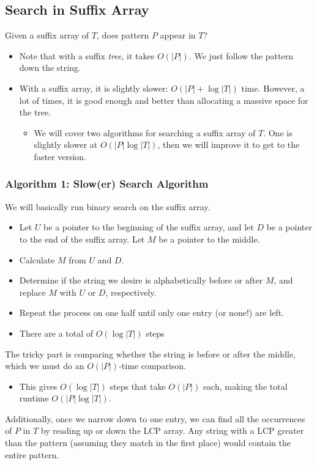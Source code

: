 \documentclass[10pt]{article}
\begin{document}
\subsection*{Search in Suffix Array}
Given a suffix array of $T$, does pattern $P$ appear in $T$?
\begin{itemize}
	\item Note that with a suffix \textit{tree}, it takes $O(|P|)$.  We just follow the pattern down the string.
	\item With a suffix array, it is slightly slower: $O(|P| + \log |T|)$ time.  However, a lot of times, it is good enough and better than allocating a massive space for the tree.
	\begin{itemize}
	    \item We will cover two algorithms for searching a suffix array of $T$.  One is slightly slower at $O(|P| \log |T|)$, then we will improve it to get to the faster version.
    \end{itemize}
\end{itemize}

\subsubsection*{Algorithm 1: Slow(er) Search Algorithm}
We will basically run binary search on the suffix array.
\begin{itemize}
	\item Let $U$ be a pointer to the beginning of the suffix array, and let $D$ be a pointer to the end of the suffix array.  Let $M$ be a pointer to the middle.
	\item Calculate $M$ from $U$ and $D$.
	\item Determine if the string we desire is alphabetically before or after $M$, and replace $M$ with $U$ or $D$, respectively.
	\item Repeat the process on one half until only one entry (or none!) are left.
	\item There are a total of $O(\log |T|)$ steps
\end{itemize}
The tricky part is comparing whether the string is before or after the middle, which we must do an $O(|P|)$-time comparison.
\begin{itemize}
	\item This gives $O(\log |T|)$ steps that take $O(|P|)$ each, making the total runtime $O(|P| \log |T|)$.
\end{itemize}
Additionally, once we narrow down to one entry, we can find all the occurrences of $P$ in $T$ by reading up or down the LCP array.  Any string with a LCP greater than the pattern (assuming they match in the first place) would contain the entire pattern.
\end{document}
